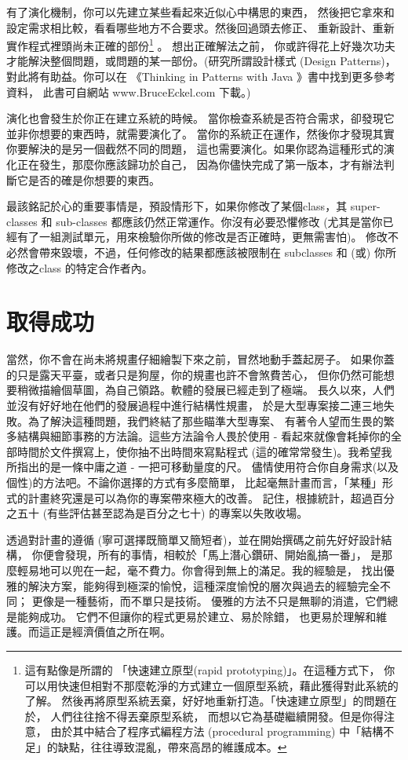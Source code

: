 有了演化機制，你可以先建立某些看起來近似心中構思的東西，
然後把它拿來和設定需求相比較，看看哪些地方不合要求。然後回過頭去修正、
重新設計、重新實作程式裡頭尚未正確的部份\footnote{這有點像是所謂的
「快速建立原型(rapid prototyping)」。在這種方式下，
你可以用快速但相對不那麼乾淨的方式建立一個原型系統，藉此獲得對此系統的了解。
然後再將原型系統丟棄，好好地重新打造。「快速建立原型」的問題在於，
人們往往捨不得丟棄原型系統， 而想以它為基礎繼續開發。但是你得注意，
由於其中結合了程序式編程方法 (procedural programming)
中「結構不足」的缺點，往往導致混亂，帶來高昂的維護成本。} 。
想出正確解法之前，
你或許得花上好幾次功夫才能解決整個問題，或問題的某一部份。(研究所謂設計樣式
(Design Patterns)，對此將有助益。你可以在
《Thinking in Patterns with Java 》書中找到更多參考資料， 此書可自網站
www.BruceEckel.com 下載。)


演化也會發生於你正在建立系統的時候。
當你檢查系統是否符合需求，卻發現它並非你想要的東西時，就需要演化了。
當你的系統正在運作，然後你才發現其實你要解決的是另一個截然不同的問題，
這也需要演化。如果你認為這種形式的演化正在發生，那麼你應該歸功於自己，
因為你儘快完成了第一版本，才有辦法判斷它是否的確是你想要的東西。

最該銘記於心的重要事情是，預設情形下，如果你修改了某個class，其 super-classes
和 sub-classes 都應該仍然正常運作。你沒有必要恐懼修改
(尤其是當你已經有了一組測試單元，用來檢驗你所做的修改是否正確時，更無需害怕)。
修改不必然會帶來毀壞，不過，任何修改的結果都應該被限制在 subclasses 和 (或)
你所修改之class 的特定合作者內。
\section{取得成功}
當然，你不會在尚未將規畫仔細繪製下來之前，冒然地動手蓋起房子。
如果你蓋的只是露天平臺，或者只是狗屋，你的規畫也許不會煞費苦心，
但你仍然可能想要稍微描繪個草圖，為自己領路。軟體的發展已經走到了極端。
長久以來，人們並沒有好好地在他們的發展過程中進行結構性規畫，
於是大型專案接二連三地失敗。為了解決這種問題，我們終結了那些瞄準大型專案、
有著令人望而生畏的繁多結構與細節事務的方法論。這些方法論令人畏於使用 -
看起來就像會耗掉你的全部時間於文件撰寫上，使你抽不出時間來寫點程式
(這的確常常發生)。我希望我所指出的是一條中庸之道 - 一把可移動量度的尺。
儘情使用符合你自身需求(以及個性)的方法吧。不論你選擇的方式有多麼簡單，
比起毫無計畫而言，「某種」形式的計畫終究還是可以為你的專案帶來極大的改善。
記住，根據統計，超過百分之五十 (有些評估甚至認為是百分之七十)
的專案以失敗收場。

透過對計畫的遵循 (寧可選擇既簡單又簡短者)，並在開始撰碼之前先好好設計結構，
你便會發現，所有的事情，相較於「馬上潛心鑽研、開始亂搞一番」，
是那麼輕易地可以兜在一起，毫不費力。你會得到無上的滿足。我的經驗是，
找出優雅的解決方案，能夠得到極深的愉悅，這種深度愉悅的層次與過去的經驗完全不同；
更像是一種藝術，而不單只是技術。
優雅的方法不只是無聊的消遣，它們總是能夠成功。
它們不但讓你的程式更易於建立、易於除錯，
也更易於理解和維護。而這正是經濟價值之所在啊。


